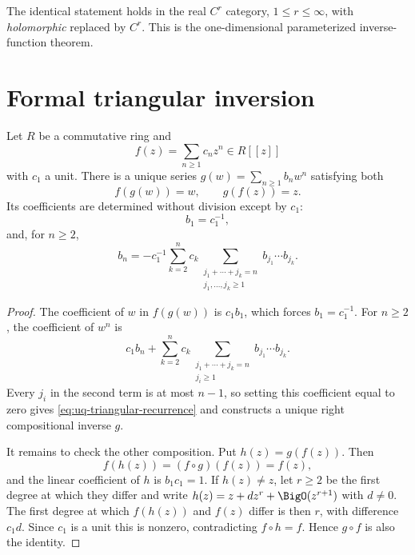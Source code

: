 \begin{remark}
The identical statement holds in the real \(C^r\) category, \(1\le r\le
\infty\), with \emph{holomorphic} replaced by \(C^r\).  This is the
one-dimensional parameterized inverse-function theorem.
\end{remark}

\section{Formal triangular inversion}
\label{sec:uq-formal-inversion}

\begin{theorem}
\label{thm:uq-triangular-inverse}
Let \(R\) be a commutative ring and
\[
 f(z)=\sum_{n\ge1}c_nz^n\in R[[z]]
\]
with \(c_1\) a unit.  There is a unique series
\(g(w)=\sum_{n\ge1}b_nw^n\) satisfying both
\[
 f(g(w))=w,\qquad g(f(z))=z.
\]
Its coefficients are determined without division except by \(c_1\):
\[
 b_1=c_1^{-1},
\]
and, for \(n\ge2\),
\begin{equation}
\label{eq:uq-triangular-recurrence}
 b_n=-c_1^{-1}\sum_{k=2}^{n}c_k
 \sum_{\substack{j_1+\cdots+j_k=n\\j_1,\ldots,j_k\ge1}}
 b_{j_1}\cdots b_{j_k}.
\end{equation}
\end{theorem}

\begin{proof}
The coefficient of \(w\) in \(f(g(w))\) is \(c_1b_1\), which forces
\(b_1=c_1^{-1}\).  For \(n\ge2\), the coefficient of \(w^n\) is
\[
 c_1b_n+
 \sum_{k=2}^{n}c_k
 \sum_{\substack{j_1+\cdots+j_k=n\\j_i\ge1}}
 b_{j_1}\cdots b_{j_k}.
\]
Every \(j_i\) in the second term is at most \(n-1\), so setting this
coefficient equal to zero gives \eqref{eq:uq-triangular-recurrence} and
constructs a unique right compositional inverse \(g\).

It remains to check the other composition.  Put \(h(z)=g(f(z))\).  Then
\[
 f(h(z))=(f\circ g)(f(z))=f(z),
\]
and the linear coefficient of \(h\) is \(b_1c_1=1\).  If
\(h(z)\ne z\), let \(r\ge2\) be the first degree at which they differ and
write \(h(z)=z+dz^r+\BigO(z^{r+1})\) with \(d\ne0\).  The first degree at
which \(f(h(z))\) and \(f(z)\) differ is then \(r\), with difference
\(c_1d\).  Since \(c_1\) is a unit this is nonzero, contradicting
\(f\circ h=f\).  Hence \(g\circ f\) is also the identity.
\end{proof}

